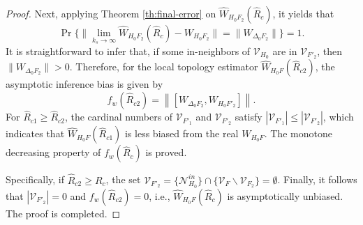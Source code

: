 \documentclass[12pt,journal,draftclsnofoot,onecolumn]{IEEEtran}
\let \sss=\scriptscriptstyle
\begin{document}
\begin{proof}
Next, applying Theorem \ref{th:final-error} on $\hat W_{\sss{H_0 F_2}}(\hat{R}_c) $, it yields that  
\begin{equation}\label{eq:local-error}
\Pr\{ \| \mathop {\lim } \limits_{ k_s \to \infty } {\hat W_{\sss{H_0 F_2}}(\hat{R}_c) }- {  W_{\sss{H_0 F_2}} } \| =\| W_{\Delta_0 \sss{F_2}}\|\}=1.  
\end{equation}
It is straightforward to infer that, if some in-neighbors of $\mathcal{V}_{\sss H_0}$ are in $\mathcal{V}_{\sss F'_2}$, then $\| W_{\Delta_0 \sss{F_2}}\|> 0$. 
Therefore, for the local topology estimator $\hat W_{\sss{H_0 F}}(\hat{R}_{c2})$, the asymptotic inference bias is given by 
\begin{equation}
f_w(\hat{R}_{c2})=  \left \| \left [ W_{\Delta_0 \sss{F_2}} , W_{\sss{H_0 F'_2}}  \right] \right \|  .  
\end{equation}
For $\hat{R}_{c1}\ge \hat{R}_{c2}$, the cardinal numbers of $\mathcal{V}_{\sss F'_1}$ and $\mathcal{V}_{\sss F'_2}$ satisfy $|\mathcal{V}_{\sss F'_1}| \le |\mathcal{V}_{\sss F'_2}|$, which indicates that $\hat W_{\sss{H_0 F}}(\hat{R}_{c1})$ is less biased from the real $W_{\sss{H_0 F}}$. 
The monotone decreasing property of $f_w(\hat{R}_c)$ is proved. 

Specifically, if $\hat{R}_{c2}\ge R_{c}$, the set $\mathcal{V}_{\sss F'_2}=\{\mathcal{N}_{\sss H_0}^{in} \}\cap \{\mathcal{V}_{\sss F}\backslash\mathcal{V}_{\sss F_2}\}=\emptyset$. 
Finally, it follows that $|\mathcal{V}_{\sss F'_2}|=0$ and $f_w(\hat{R}_{c2})=0$, i.e., $\hat W_{\sss{H_0 F}}(\hat{R}_c) $ is asymptotically unbiased. 
The proof is completed. 
\end{proof}
\end{document}
